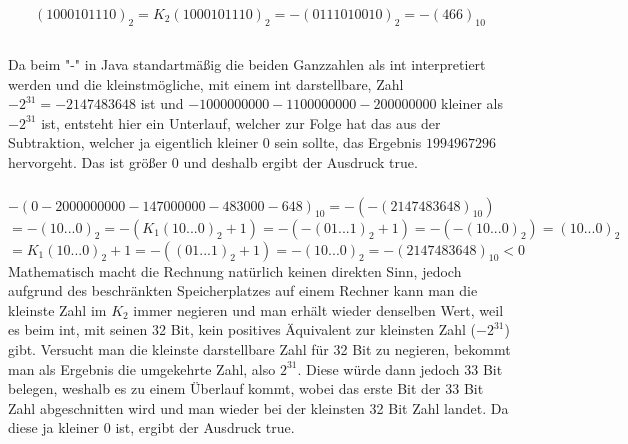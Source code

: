 \documentclass[12pt]{article}
\begin{document}
\subsubsection{}
$$ (1000101110)_2 = K_2(1000101110)_2 = -(0111010010)_2 = -(466)_{10} $$

\subsection{}
\subsubsection{}
\begin{center}
    Da beim "-" in Java standartmäßig die beiden Ganzzahlen als int interpretiert werden und die kleinstmögliche, mit einem int darstellbare, Zahl $-2^{31} = -2147483648$ ist und $-1000000000 -1100000000 -200000000$ kleiner als $-2^{31}$ ist, entsteht hier ein Unterlauf, welcher zur Folge hat das aus der Subtraktion, welcher ja eigentlich kleiner 0 sein sollte, das Ergebnis $1994967296$ hervorgeht.
    Das ist größer 0 und deshalb ergibt der Ausdruck true.
\end{center}
\subsubsection{}
\begin{center}
    $ -(0-2000000000-147000000-483000-648)_{10} = -(-(2147483648)_{10})$
    $ = -(10...0)_2 = -(K_1(10...0)_2+1) = -(-(01...1)_2 + 1) = -(-(10...0)_2) = (10...0)_2$
    $ = K_1(10...0)_2 + 1 = -((01...1)_2 + 1) = -(10...0)_2 = -(2147483648)_{10} < 0$
    \bigbreak
    Mathematisch macht die Rechnung natürlich keinen direkten Sinn, jedoch aufgrund des beschränkten Speicherplatzes auf einem Rechner kann man die kleinste Zahl im $K_2$ immer negieren und man erhält wieder denselben Wert, weil es beim int, mit seinen 32 Bit, kein positives Äquivalent zur kleinsten Zahl ($-2^{31}$) gibt. Versucht man die kleinste darstellbare Zahl für 32 Bit zu negieren, bekommt man als Ergebnis die umgekehrte Zahl, also $2^{31}$. Diese würde dann jedoch 33 Bit belegen, weshalb es zu einem Überlauf kommt, wobei das erste Bit der 33 Bit Zahl abgeschnitten wird und man wieder bei der kleinsten 32 Bit Zahl landet. Da diese ja kleiner 0 ist, ergibt der Ausdruck true.
\end{center}
\end{document}

